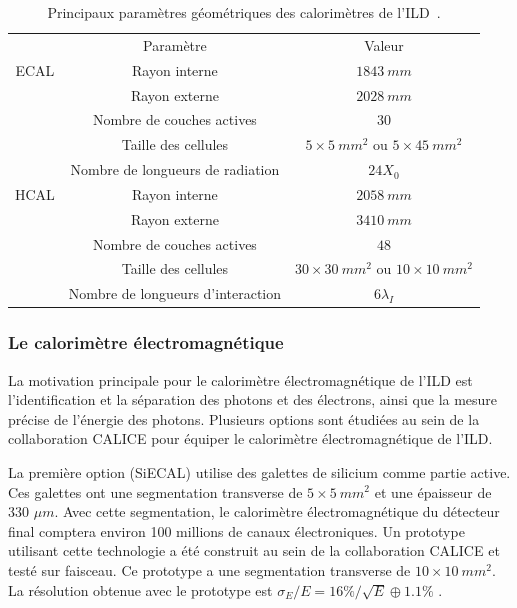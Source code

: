 \begin{table}[!ht]
  \begin{center}
    \begin{tabular}{c|c|c}
      \rowcolor{black!20!white} $ $ & Paramètre & Valeur \\
      \rowcolor{black!5!white} ECAL & Rayon interne & $1843~mm$ \\
      \rowcolor{black!5!white} $ $ & Rayon externe & $2028~mm$ \\
      \rowcolor{black!5!white} $ $ & Nombre de couches actives & $30$ \\
      \rowcolor{black!5!white} $ $ & Taille des cellules & $5\times5~mm^2$ ou $5\times45~mm^2$\\
      \rowcolor{black!5!white} $ $ & Nombre de longueurs de radiation & $24X_0$ \\
      \hline
      \rowcolor{black!5!white} HCAL & Rayon interne & $2058~mm$ \\
      \rowcolor{black!5!white} $ $ & Rayon externe & $3410~mm$ \\
      \rowcolor{black!5!white} $ $ & Nombre de couches actives & $48$ \\
      \rowcolor{black!5!white} $ $ & Taille des cellules & $30\times30~mm^2$ ou $10\times10~mm^2$ \\
      \rowcolor{black!5!white} $ $ & Nombre de longueurs d'interaction & $6\lambda_I$ \\
    \end{tabular}
  \end{center}  
  \caption{Principaux paramètres géométriques des calorimètres de l'ILD~\cite{detectorTDR}.}
  \label{tab.caloParams}
\end{table}

\subsubsection{Le calorimètre électromagnétique}
La motivation principale pour le calorimètre électromagnétique de l'ILD est l'identification et la séparation des photons et des électrons, ainsi que la mesure précise de l'énergie des photons. Plusieurs options sont étudiées au sein de la collaboration CALICE pour équiper le calorimètre électromagnétique de l'ILD. 

La première option (SiECAL) utilise des galettes de silicium comme partie active. Ces galettes ont une segmentation transverse de $5\times5~mm^2$ et une épaisseur de 330 $\mu m$. Avec cette segmentation, le calorimètre électromagnétique du détecteur final comptera environ 100 millions de canaux électroniques. Un prototype utilisant cette technologie a été construit au sein de la collaboration CALICE et testé sur faisceau. Ce prototype a une segmentation transverse de $10\times10~mm^2$. La résolution obtenue avec le prototype est $\sigma_E/E=16\%/\sqrt{E}\oplus1.1\%$ \cite{siw-ecal}. 

